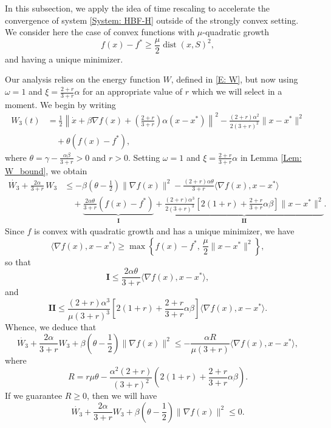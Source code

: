 \documentclass[pdflatex,sn-mathphys-num]{sn-jnl}
\theoremstyle{thmstyleone}
\theoremstyle{thmstyletwo}
\theoremstyle{thmstylethree}
\DeclareMathOperator{\dist}{dist}
\begin{document}
In this subsection, we apply the idea of time rescaling to accelerate the convergence of system \eqref{System: HBF-H} outside of the strongly convex setting. We consider here the case of convex functions with $\mu$-quadratic growth 
$$f(x)-f^*\ge \frac{\mu}{2}\dist(x,S)^2,$$ 
and having a unique minimizer.   

Our analysis relies on the energy function $W$, defined in \eqref{E: W}, but now using $\omega=1$ and $\xi=\frac{2+r}{3+r}\alpha$ for an appropriate value of $r$ which we will select in a moment. We begin by writing
\begin{equation}\label{E: V_QG}
\begin{aligned}
W_3(t) 
&= \frac{1}{2}\left\| \dot{x} + \beta\nabla f(x) + \left(\frac{2+r}{3+r}\right)\alpha(x-x^*) \right\|^2 
 - \frac{(2+r)\alpha^2}{2(3+r)^2}\| x - x^* \|^2 \\
&\quad + \theta\left( f(x) - f^* \right),
\end{aligned}
\end{equation}
where $\theta=\gamma-\frac{\alpha\beta}{3+r}>0$ and $r>0$. Setting $\omega=1$ and $\xi=\frac{2+r}{3+r}\alpha$ in Lemma \ref{Lem: W_bound}, we obtain 
\begin{align*}
\dot{W_3} + \frac{2\alpha }{3+r}\,W_3
&\le -\beta\left( \theta - \frac{1}{2} \right)\| \nabla f(x) \|^2 
  - \frac{(2+r)\alpha\theta}{3+r} \langle \nabla f(x), x-x^* \rangle \\
&\quad  + \underbrace{ \frac{2\alpha\theta}{3+r}\left( f(x) - f^* \right) }_{\mathbf{I}} + \underbrace{ \frac{(2+r)\alpha^3}{2(3+r)^3} \left[ 2(1+r) + \frac{2+r}{3+r}\alpha\beta \right]\| x-x^* \|^2 }_{\mathbf{II}}.
\end{align*}
Since $f$ is convex with quadratic growth and has a unique minimizer, we have 
$$ \langle \nabla f(x), x-x^* \rangle \ge \max\left\{ f(x) - f^*,\, \frac{\mu}{2}\| x-x^* \|^2 \right\}, $$
so that
$$ \mathbf{I} \le \frac{2\alpha\theta}{3+r} \langle \nabla f(x), x-x^* \rangle, $$
and
$$ \mathbf{II} \le \frac{(2+r)\alpha^3}{\mu(3+r)^3} \left[ 2(1+r) + \frac{2+r}{3+r}\alpha\beta \right] \langle \nabla f(x), x-x^* \rangle. $$
Whence, we deduce that
$$\dot{W_3} + \frac{2\alpha}{3+r}W_3 + \beta\left( \theta - \frac{1}{2} \right)\| \nabla f(x) \|^2
\le -\frac{\alpha R}{\mu(3+r)} \langle \nabla f(x), x-x^* \rangle,$$
where
$$ R= r\mu\theta - \frac{\alpha^2(2+r)}{(3+r)^2}\left( 2(1+r) + \frac{2+r}{3+r}\alpha\beta \right). $$
If we guarantee $R\ge 0$, then we will have
\begin{equation} \label{E:W3}
\dot{W_3} + \frac{2\alpha}{3+r}W_3 + \beta\left( \theta - \frac{1}{2} \right)\| \nabla f(x) \|^2 \le 0.
\end{equation} 
\end{document}

